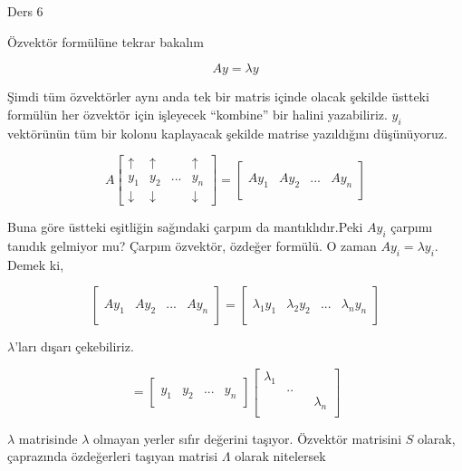 \documentclass[12pt,fleqn]{article}\usepackage{../../common}
\begin{document}
Ders 6

Özvektör formülüne tekrar bakalım

$$ Ay = \lambda y $$

Şimdi tüm özvektörler aynı anda tek bir matris içinde olacak şekilde
üstteki formülün her özvektör için işleyecek ``kombine'' bir halini
yazabiliriz. $y_i$ vektörünün tüm bir kolonu kaplayacak şekilde matrise
yazıldığını düşünüyoruz. 

$$ 
A 
\left[\begin{array}{cccc}
\uparrow & \uparrow &  & \uparrow \\
y_1 & y_2 & ... & y_n \\
\downarrow & \downarrow &  & \downarrow 
\end{array}\right]
= 
\left[\begin{array}{cccc}
&&& \\
Ay_1 & Ay_2 & ... & Ay_n \\
&&& 
\end{array}\right]
$$

Buna göre üstteki eşitliğin sağındaki çarpım da mantıklıdır.Peki $Ay_i$
çarpımı tanıdık gelmiyor mu? Çarpım özvektör, özdeğer formülü. O zaman
$Ay_i = \lambda y_i$. Demek ki,

$$ 
\left[\begin{array}{cccc}
&&& \\
Ay_1 & Ay_2 & ... & Ay_n \\
&&& 
\end{array}\right]
= 
\left[\begin{array}{cccc}
&&& \\
\lambda_1y_1 & \lambda_2y_2 & ... & \lambda_ny_n \\
&&& 
\end{array}\right]
 $$

$\lambda$'ları dışarı çekebiliriz. 

$$ 
= \left[\begin{array}{cccc}
&&& \\
y_1 & y_2 & ... & y_n \\
&&& 
\end{array}\right]
\left[\begin{array}{cccc}
\lambda_1 &&& \\
& .. && \\
&&& \lambda_n \\
\end{array}\right]
 $$

$\lambda$ matrisinde $\lambda$ olmayan yerler sıfır değerini
taşıyor. Özvektör matrisini $S$ olarak, çaprazında özdeğerleri taşıyan
matrisi $\Lambda$ olarak nitelersek
\end{document}
